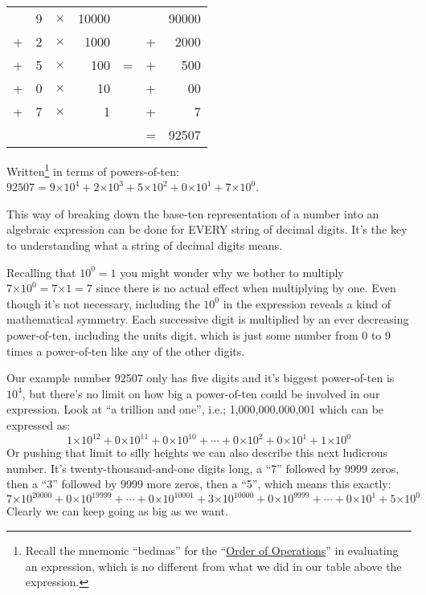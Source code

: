 \documentclass{article}
\begin{document}
\begin{center}
\begin{tabular}{r r r r c r r}
\phantom & 9 & $\times$ & 10000 & \phantom & \phantom & 90000\\
+ & 2 & $\times$ & 1000 & \phantom & + & 2000\\
+ & 5 & $\times$ & 100 & \; \; \; = \; \; \; & + & 500\\
+ & 0 & $\times$ & 10 & \phantom & + & 00\\
+ & 7 & $\times$ & 1 & \phantom & + & 7\\
\cline{6-7}
\phantom & \phantom & \phantom & \phantom & \phantom & = & 92507
\end{tabular}
\end{center}

Written\footnote{Recall the mnemonic ``bedmas'' for
the ``\href{https://en.wikipedia.org/wiki/Order_of_operations}{Order of Operations}'' in
evaluating an expression, which is no different from
what we did in our table above the expression.}
in terms of powers-of-ten:
$92507=9{\times{}}10^4+2{\times{}}10^3+5{\times{}}10^2+0{\times{}}10^1+7{\times{}}10^0$.

This way of breaking down the base-ten representation of a number into
an algebraic expression can be done for EVERY string of decimal digits. It's the key to 
understanding what a string of decimal digits means.

Recalling that $10^0 = 1$ you might wonder why we bother to multiply
$7{\times{}}10^0=7{\times{}}1=7$ since there is no actual effect
when multiplying by one.
Even though it's not necessary, including the $10^0$ in the
expression reveals a kind of mathematical symmetry.
Each successive digit is multiplied by an ever
decreasing power-of-ten, including
the units digit,
which is just some number from 0 to 9 times a power-of-ten
like any of the other digits.

Our example number 92507 only has five digits and it's biggest power-of-ten is $10^4$,
but there's
no limit on how big a power-of-ten could be involved in our expression.
Look at ``a trillion and one'', i.e.; 1,000,000,000,001 which can be expressed as:
\[1{\times{}}10^{12}+0{\times{}}10^{11}+0{\times{}}10^{10}+\cdots{}+0{\times{}}10^{2}+0{\times{}}10^{1}+1{\times{}}10^{0}\]
%
Or pushing that limit to silly heights we can also describe this next ludicrous number.
It's twenty-thousand-and-one digits long, a
``7'' followed by 9999 zeros, then a ``3''
followed by 9999 more zeros, then a ``5'', which means this exactly:
\[
7{\times{}}10^{20000}+0{\times{}}10^{19999}+\cdots{}+0{\times{}}10^{10001}+3{\times{}}10^{10000}+0{\times{}}10^{9999}+\cdots{}+0{\times{}}10^{1}+5{\times{}}10^{0}\]
Clearly we can keep going as big as we want.
\end{document}
